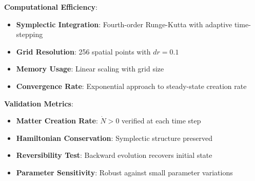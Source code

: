 \documentclass[11pt]{article}
\begin{document}
\textbf{Computational Efficiency}:
\begin{itemize}
\item \textbf{Symplectic Integration}: Fourth-order Runge-Kutta with adaptive time-stepping
\item \textbf{Grid Resolution}: 256 spatial points with $dr = 0.1$
\item \textbf{Memory Usage}: Linear scaling with grid size
\item \textbf{Convergence Rate}: Exponential approach to steady-state creation rate
\end{itemize}

\textbf{Validation Metrics}:
\begin{itemize}
\item \textbf{Matter Creation Rate}: $\dot{N} > 0$ verified at each time step
\item \textbf{Hamiltonian Conservation}: Symplectic structure preserved
\item \textbf{Reversibility Test}: Backward evolution recovers initial state
\item \textbf{Parameter Sensitivity}: Robust against small parameter variations
\end{itemize}
\end{document}
